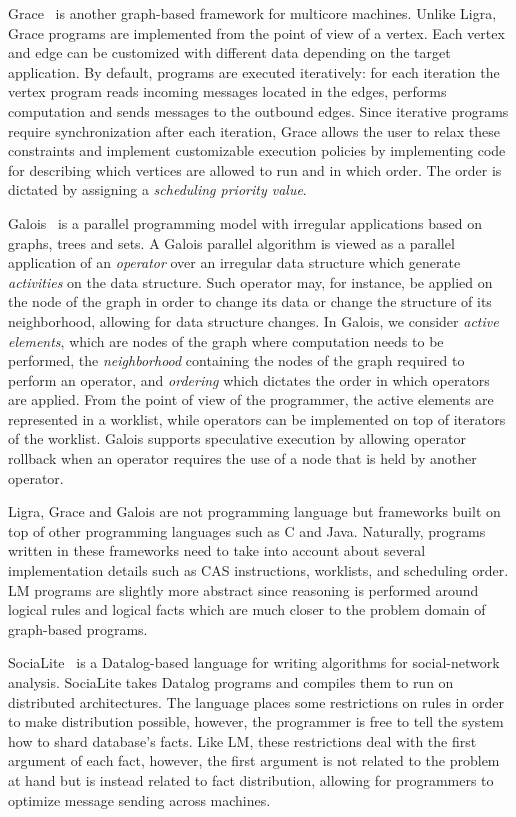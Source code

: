 Grace~\cite{wang:asynchronous} is another graph-based framework for multicore
machines. Unlike Ligra, Grace programs are implemented from the point of view of
a vertex. Each vertex and edge can be customized with different data depending
on the target application. By default, programs are executed iteratively: for
each iteration the vertex program reads incoming messages located in the edges,
performs computation and sends messages to the outbound edges. Since iterative
programs require synchronization after each iteration, Grace allows the user to
relax these constraints and implement customizable execution policies by
implementing code for describing which vertices are allowed to run and in which
order. The order is dictated by assigning a \emph{scheduling priority value}.

Galois~\cite{Pingali:2011:TPA:1993316.1993501} is a parallel programming model
with irregular applications based on graphs, trees and sets. A Galois parallel
algorithm is viewed as a parallel application of an \emph{operator} over an
irregular data structure which generate \emph{activities} on the data structure.
Such operator may, for instance, be applied on the node of the graph in order to
change its data or change the structure of its neighborhood, allowing for data
structure changes. In Galois, we consider \emph{active elements}, which are
nodes of the graph where computation needs to be performed, the
\emph{neighborhood} containing the nodes of the graph required to perform an
operator, and \emph{ordering} which dictates the order in which operators are
applied. From the point of view of the programmer, the active elements are
represented in a worklist, while operators can be implemented on top of
iterators of the worklist. Galois supports speculative execution by allowing
operator rollback when an operator requires the use of a node that is held by
another operator.

Ligra, Grace and Galois are not programming language but frameworks built on top
of other programming languages such as C and Java. Naturally, programs written
in these frameworks need to take into account about several implementation
details such as CAS instructions, worklists, and scheduling order. LM programs
are slightly more abstract since reasoning is performed around logical rules and
logical facts which are much closer to the problem domain of graph-based
programs.

SociaLite~\cite{Seo:2013:DSD:2556549.2556572} is a Datalog-based language for
writing algorithms for social-network analysis. SociaLite takes Datalog programs
and compiles them to run on distributed architectures. The language places some
restrictions on rules in order to make distribution possible, however, the
programmer is free to tell the system how to shard database's facts. Like LM, these
restrictions deal with the first argument of each fact, however, the first
argument is not related to the problem at hand but is instead related to fact
distribution, allowing for programmers to optimize message sending across
machines.

